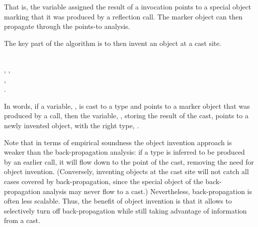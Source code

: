 \noindent That is, the variable assigned the result of a 
invocation points to a special object marking that it was produced
by a reflection call. The marker object can then propagate through
the points-to analysis.

The key part of the algorithm is to then invent an object at a cast
site.

\begin{minipage}{0.95\columnwidth}
  \begin{rules}
      \\
    \tab {}, ,\\
    \tab {}, \\
    \tab {}.
  \end{rules}
\end{minipage}

\noindent In words, if a variable, , is cast to a type
 and points to a marker object that was produced by a
 call, then the variable, , storing the result
of the cast, points to a newly invented object, with the right type,
.

Note that in terms of empirical soundness the object invention
approach is weaker than the back-propagation analysis: if a type is
inferred to be produced by an earlier  call, it will flow
down to the point of the cast, removing the need for object
invention. (Conversely, inventing objects at the cast site will not
catch all cases covered by back-propagation, since the special object
of the back-propagation analysis may never flow to a cast.)
Nevertheless, back-propagation is often less scalable. Thus, the
benefit of object invention is that it allows to selectively turn off
back-propagation while still taking advantage of information from a
cast.







